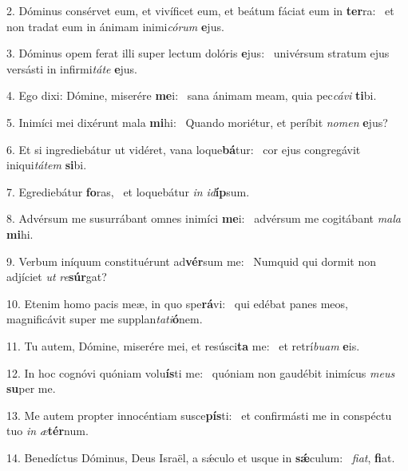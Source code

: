 2. Dóminus consérvet eum, et vivíficet eum, et beátum fáciat eum in \textbf{ter}ra: \ast\  et non tradat eum in ánimam inimi\textit{có}\textit{rum} \textbf{e}jus.\

3. Dóminus opem ferat illi super lectum dolóris \textbf{e}jus: \ast\  univérsum stratum ejus versásti in infirmi\textit{tá}\textit{te} \textbf{e}jus.\

4. Ego dixi: Dómine, miserére \textbf{me}i: \ast\  sana ánimam meam, quia pec\textit{cá}\textit{vi} \textbf{ti}bi.\

5. Inimíci mei dixérunt mala \textbf{mi}hi: \ast\  Quando moriétur, et períbit \textit{no}\textit{men} \textbf{e}jus?\

6. Et si ingrediebátur ut vidéret, vana loque\textbf{bá}tur: \ast\  cor ejus congregávit iniqui\textit{tá}\textit{tem} \textbf{si}bi.\

7. Egrediebátur \textbf{fo}ras, \ast\  et loquebátur \textit{in} \textit{id}\textbf{íp}sum.\

8. Advérsum me susurrábant omnes inimíci \textbf{me}i: \ast\  advérsum me cogitábant \textit{ma}\textit{la} \textbf{mi}hi.\

9. Verbum iníquum constituérunt ad\textbf{vér}sum me: \ast\  Numquid qui dormit non adjíciet \textit{ut} \textit{re}\textbf{súr}gat?\

10. Etenim homo pacis meæ, in quo spe\textbf{rá}vi: \ast\  qui edébat panes meos, magnificávit super me supplan\textit{ta}\textit{ti}\textbf{ó}nem.\

11. Tu autem, Dómine, miserére mei, et resúsci\textbf{ta} me: \ast\  et retrí\textit{bu}\textit{am} \textbf{e}is.\

12. In hoc cognóvi quóniam volu\textbf{ís}ti me: \ast\  quóniam non gaudébit inimícus \textit{me}\textit{us} \textbf{su}per me.\

13. Me autem propter innocéntiam susce\textbf{pís}ti: \ast\  et confirmásti me in conspéctu tuo \textit{in} \textit{æ}\textbf{tér}num.\

14. Benedíctus Dóminus, Deus Israël, a sǽculo et usque in \textbf{sǽ}culum: \ast\  \textit{fi}\textit{at}, \textbf{fi}at.\

